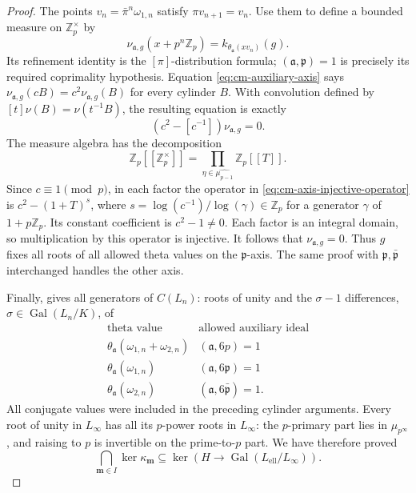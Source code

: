 \documentclass[11pt]{article}
\theoremstyle{definition}\newtheorem{definition}[theorem]{Definition}
\begin{document}
\begin{proof}
The points \(v_n=\bar\pi^n\omega_{1,n}\) satisfy
\(\pi v_{n+1}=v_n\).
Use them to define a bounded measure on \(\mathbb Z_p^\times\) by
\[
 \nu_{\mathfrak a,g}(x+p^n\mathbb Z_p)
                    =k_{\theta_{\mathfrak a}(xv_n)}(g).
\]
Its refinement identity is the \([\pi]\)-distribution formula;
\((\mathfrak a,\mathfrak p)=1\) is precisely its required
coprimality hypothesis.
Equation \eqref{eq:cm-auxiliary-axis} says
\(\nu_{\mathfrak a,g}(cB)=c^2\nu_{\mathfrak a,g}(B)\)
for every cylinder \(B\).
With convolution defined by
\([t]\nu(B)=\nu(t^{-1}B)\), the resulting equation is exactly
\begin{equation}\label{eq:cm-axis-injective-operator}
                    (c^2-[c^{-1}])\nu_{\mathfrak a,g}=0.
\end{equation}
The measure algebra has the decomposition
\[
 \mathbb Z_p[[\mathbb Z_p^\times]]
   =\prod_{\eta\in\widehat{\mu_{p-1}}}\mathbb Z_p[[T]].
\]
Since \(c\equiv1\pmod p\), in each factor the operator in
\eqref{eq:cm-axis-injective-operator} is
\(c^2-(1+T)^s\), where
\(s=\log(c^{-1})/\log(\gamma)\in\mathbb Z_p\) for a generator
\(\gamma\) of \(1+p\mathbb Z_p\).
Its constant coefficient is \(c^2-1\ne0\).
Each factor is an integral domain, so multiplication by this
operator is injective.
It follows that \(\nu_{\mathfrak a,g}=0\).
Thus \(g\) fixes all roots of all allowed theta values on the
\(\mathfrak p\)-axis.  The same proof with
\(\mathfrak p,\bar{\mathfrak p}\) interchanged handles the other
axis.

Finally, \cite[Proposition 2.9, pp.~9--10]{IshiiSoule} gives all
generators of \(C(L_n)\): roots of unity and the
\(\sigma-1\) differences, \(\sigma\in\operatorname{Gal}(L_n/K)\),
of
\[
 \begin{array}{c|c}
 \text{theta value}&\text{allowed auxiliary ideal}\\ \hline
 \theta_{\mathfrak a}(\omega_{1,n}+\omega_{2,n})
                       &(\mathfrak a,6p)=1\\
 \theta_{\mathfrak a}(\omega_{1,n})
                       &(\mathfrak a,6\mathfrak p)=1\\
 \theta_{\mathfrak a}(\omega_{2,n})
                       &(\mathfrak a,6\bar{\mathfrak p})=1 .
 \end{array}
\]
All conjugate values were included in the preceding cylinder
arguments.
Every root of unity in \(L_\infty\) has all its \(p\)-power roots
in \(L_\infty\): the \(p\)-primary part lies in
\(\mu_{p^\infty}\), and raising to \(p\) is invertible on the
prime-to-\(p\) part.
We have therefore proved
\begin{equation}\label{eq:cm-radical-kernel-inclusion}
 \bigcap_{\boldsymbol m\in I}\ker\kappa_{\boldsymbol m}
        \subseteq
 \ker\!\left(H\longrightarrow
                  \operatorname{Gal}(L_{\mathrm{ell}}/L_\infty)\right).
\end{equation}


\end{proof}
\end{document}

